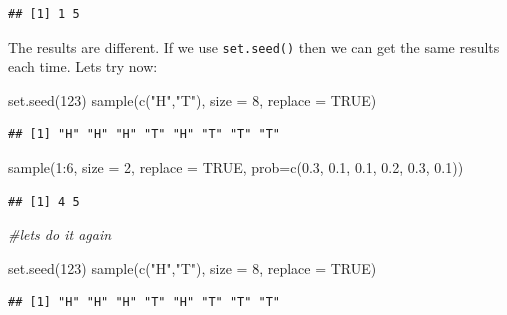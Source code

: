 \documentclass[
]{book}
\newenvironment{Shaded}{\begin{snugshade}}{\end{snugshade}}
\newcommand{\AttributeTok}[1]{\textcolor[rgb]{0.77,0.63,0.00}{#1}}
\newcommand{\CommentTok}[1]{\textcolor[rgb]{0.56,0.35,0.01}{\textit{#1}}}
\newcommand{\ConstantTok}[1]{\textcolor[rgb]{0.00,0.00,0.00}{#1}}
\newcommand{\DecValTok}[1]{\textcolor[rgb]{0.00,0.00,0.81}{#1}}
\newcommand{\FloatTok}[1]{\textcolor[rgb]{0.00,0.00,0.81}{#1}}
\newcommand{\FunctionTok}[1]{\textcolor[rgb]{0.00,0.00,0.00}{#1}}
\newcommand{\NormalTok}[1]{#1}
\newcommand{\SpecialCharTok}[1]{\textcolor[rgb]{0.00,0.00,0.00}{#1}}
\newcommand{\StringTok}[1]{\textcolor[rgb]{0.31,0.60,0.02}{#1}}
\begin{document}
\begin{verbatim}
## [1] 1 5
\end{verbatim}

The results are different. If we use \texttt{set.seed()} then we can get the same results each time. Lets try now:

\begin{Shaded}
\begin{Highlighting}[]
\FunctionTok{set.seed}\NormalTok{(}\DecValTok{123}\NormalTok{)}
\FunctionTok{sample}\NormalTok{(}\FunctionTok{c}\NormalTok{(}\StringTok{"H"}\NormalTok{,}\StringTok{"T"}\NormalTok{), }\AttributeTok{size =} \DecValTok{8}\NormalTok{, }\AttributeTok{replace =} \ConstantTok{TRUE}\NormalTok{)  }
\end{Highlighting}
\end{Shaded}

\begin{verbatim}
## [1] "H" "H" "H" "T" "H" "T" "T" "T"
\end{verbatim}

\begin{Shaded}
\begin{Highlighting}[]
\FunctionTok{sample}\NormalTok{(}\DecValTok{1}\SpecialCharTok{:}\DecValTok{6}\NormalTok{, }\AttributeTok{size =} \DecValTok{2}\NormalTok{, }\AttributeTok{replace =} \ConstantTok{TRUE}\NormalTok{, }\AttributeTok{prob=}\FunctionTok{c}\NormalTok{(}\FloatTok{0.3}\NormalTok{, }\FloatTok{0.1}\NormalTok{, }\FloatTok{0.1}\NormalTok{, }\FloatTok{0.2}\NormalTok{, }\FloatTok{0.3}\NormalTok{, }\FloatTok{0.1}\NormalTok{))}
\end{Highlighting}
\end{Shaded}

\begin{verbatim}
## [1] 4 5
\end{verbatim}

\begin{Shaded}
\begin{Highlighting}[]
\CommentTok{\#let\textquotesingle{}s do it again}

\FunctionTok{set.seed}\NormalTok{(}\DecValTok{123}\NormalTok{)}
\FunctionTok{sample}\NormalTok{(}\FunctionTok{c}\NormalTok{(}\StringTok{"H"}\NormalTok{,}\StringTok{"T"}\NormalTok{), }\AttributeTok{size =} \DecValTok{8}\NormalTok{, }\AttributeTok{replace =} \ConstantTok{TRUE}\NormalTok{) }
\end{Highlighting}
\end{Shaded}

\begin{verbatim}
## [1] "H" "H" "H" "T" "H" "T" "T" "T"
\end{verbatim}
\end{document}
